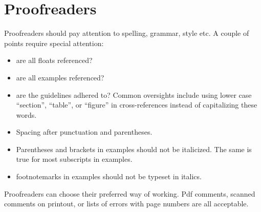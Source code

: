 \chapter{Proofreaders}
Proofreaders should pay attention to spelling, grammar, style etc. A couple of points require special attention:
\begin{itemize}
 \item are all floats referenced?
 \item are all examples referenced?
 \item are the guidelines adhered to? Common oversights include using 
        lower case ``section'', ``table'', or ``figure'' in cross-references instead of capitalizing these words. 
 \item Spacing after punctuation and parentheses.
 \item Parentheses and brackets in examples should not be italicized. The same is true for most subscripts in examples.
 \item footnotemarks in examples should not be typeset in italics.
\end{itemize}

Proofreaders can choose their preferred way of working. Pdf comments, scanned comments on printout, or lists of errors with page numbers are all acceptable.








